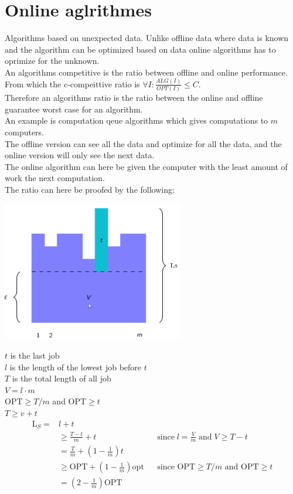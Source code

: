 \documentclass[12pt, a4paper]{article}
\begin{document}
		\section{Online aglrithmes}
			Algorithms based on unexpected data. Unlike offline data where data is known and the algorithm can be optimized based on data online algorithms has to oprimize for the unknown.\\
			An algorithms competitive is the ratio between offline and online performance. From which the c-compeittive ratio is $\forall I: \frac{ALG(I)}{OPT(I)}\leq C$.\\
			Therefore an algorithms ratio is the ratio between the online and offline guarantee worst case for an algorithm.\\
			An example is computation qeue algorithms which gives computations to $m$ computers. \\
			The offline version can see all the data and optimize for all the data, and the online version will only see the next data.\\
			The online algorithm can here be given the computer with the least amount of work the next computation.\\
			The ratio can here be proofed by the following:\\
			\begin{center}
				\includegraphics[width=300px]{assets/onlineAlg.png}
			\end{center}
			$t$ is the last job\\
			$l$ is the length of the lowest job before $t$\\
			$T$ is the total length of all job\\
			$V=l\cdot m$\\
			OPT$\geq T/m$ and OPT$\geq t$\\
			$T\geq v+t$\\
			\begin{align*}
				\text{L}_S=&l+t\\
						&\geq \frac{T-t}{m}+t&&\text{since}\; l=\frac{V}{m} \;\text{and}\; V\geq T-t\\
						&=\frac{T}{m}+(1-\frac{1}{m})t\\
						&\geq \text{OPT}+(1-\frac{1}{m})\text{opt}&&\text{since OPT$\geq T/m$ and OPT$\geq t$}\\
						&=(2-\frac{1}{m})\text{OPT}
			\end{align*}
			
\end{document}
